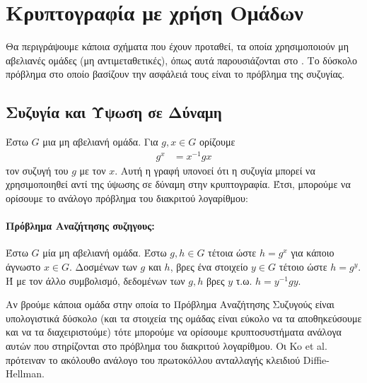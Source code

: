 

\section{Κρυπτογραφία με χρήση Ομάδων}

Θα περιγράψουμε κάποια σχήματα που έχουν προταθεί, τα οποία χρησιμοποιούν μη αβελιανές ομάδες (μη αντιμεταθετικές), όπως αυτά παρουσιάζονται στο \cite{basic}. Το δύσκολο πρόβλημα στο οποίο βασίζουν την ασφάλειά τους είναι το πρόβλημα της συζυγίας.

\subsection{Συζυγία και Ύψωση σε Δύναμη}
Έστω $ G $ μια μη αβελιανή ομάδα. Για $ g,x \in G $ ορίζουμε 
\begin{align*}
g^x &= x^{-1}gx
\end{align*}
τον συζυγή του $ g $ με τον $ x $. Αυτή η γραφή υπονοεί ότι η συζυγία μπορεί να χρησιμοποιηθεί αντί της ύψωσης σε δύναμη στην κρυπτογραφία. Έτσι, μπορούμε να ορίσουμε το ανάλογο πρόβλημα του διακριτού λογαρίθμου:
\paragraph*{Πρόβλημα Αναζήτησης συζηγους:} Έστω $ G $ μία μη αβελιανή ομάδα. Έστω $ g,h \in G $ τέτοια ώστε $ h=g^x $ για κάποιο άγνωστο $ x\in G $. Δοσμένων των $ g $ και $ h$, βρες ένα στοιχείο $ y \in G $ τέτοιο ώστε $ h = g^y $. Ή με τον άλλο συμβολισμό, δεδομένων των $g,h$ βρες $y$ τ.ω. $h=y^{-1}gy$.

Αν βρούμε κάποια ομάδα στην οποία το Πρόβλημα Αναζήτησης Συζυγούς είναι υπολογιστικά δύσκολο (και τα στοιχεία της ομάδας είναι εύκολο να τα αποθηκεύσουμε και να τα διαχειριστούμε) τότε μπορούμε να ορίσουμε κρυπτοσυστήματα ανάλογα αυτών που στηρίζονται στο πρόβλημα του διακριτού λογαρίθμου. Οι Ko et al. πρότειναν το ακόλουθο ανάλογο του πρωτοκόλλου ανταλλαγής κλειδιού Diffie-Hellman.
\label{ko}
